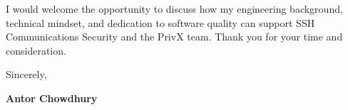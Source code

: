 \documentclass[a4paper,11pt]{article}
\begin{document}
I would welcome the opportunity to discuss how my engineering background, technical mindset, and dedication to software quality can support SSH Communications Security and the PrivX team. Thank you for your time and consideration.

\vspace{12pt}

Sincerely,

\vspace{8pt}

\textbf{Antor Chowdhury}
\end{document}
